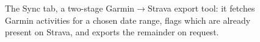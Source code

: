\begin{figure}[ht]
\centering
{}
\caption[Sync tab]{The Sync tab, a two-stage Garmin$\to$Strava export tool: it fetches Garmin activities for a chosen date range, flags which are already present on Strava, and exports the remainder on request.}\label{fig:screenshot_sync}
\end{figure}
